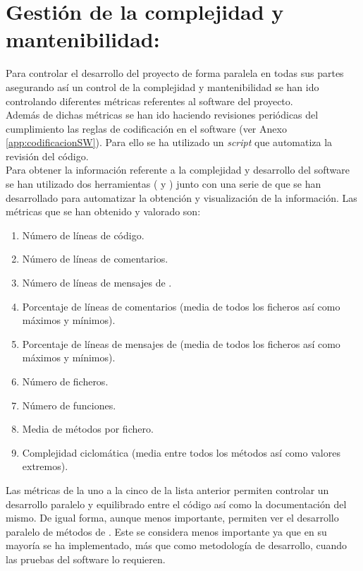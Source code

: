 \section{Gestión de la complejidad y mantenibilidad:} \label{sec:SW:gestion_complejidad}
    Para controlar el desarrollo del proyecto de forma paralela en todas sus partes asegurando así un control de la complejidad y mantenibilidad se han ido controlando diferentes métricas referentes al software del proyecto. 
    \\ 
    
    Además de dichas métricas se han ido haciendo revisiones periódicas del cumplimiento las reglas de codificación en el software (ver Anexo \ref{app:codificacionSW}). Para ello se ha utilizado un \textit{script}  que automatiza la revisión del código.
    \\
    
    Para obtener la información referente a la complejidad y desarrollo del software se han utilizado dos herramientas ( y ) junto con una serie de  que se han desarrollado para automatizar la obtención y visualización de la información. Las métricas que se han obtenido y valorado son:
    
    \begin{enumerate}
        \item Número de líneas de código.
        \item Número de líneas de comentarios.
        \item Número de líneas de mensajes de .
        \item Porcentaje de líneas de comentarios (media de todos los ficheros así como máximos y mínimos).
        \item Porcentaje de líneas de mensajes de  (media de todos los ficheros así como máximos y mínimos).
        \item Número de ficheros.
        \item Número de funciones.
        \item Media de métodos por fichero.
        \item Complejidad ciclomática (media entre todos los métodos así como valores extremos).
    \end{enumerate}
    
    Las métricas de la uno a la cinco de la lista anterior permiten controlar un desarrollo paralelo y equilibrado entre el código así como la documentación del mismo. De igual forma, aunque menos importante, permiten ver el desarrollo paralelo de métodos de . Este se considera menos importante ya que en su mayoría se ha implementado, más que como metodología de desarrollo, cuando las pruebas del software lo requieren.
    \\ 
    
